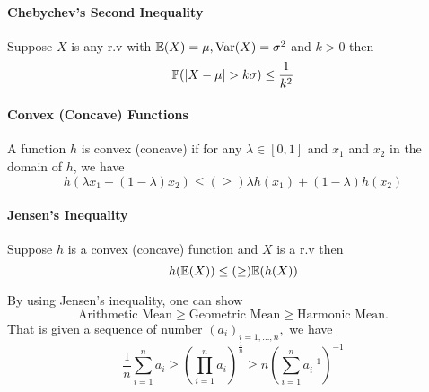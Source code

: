 \paragraph{Chebychev's Second Inequality}
Suppose \(X\) is any r.v with \(\mathbb{E}(X) = \mu, \operatorname{Var}(X) = \sigma^2\) and \(k > 0\) then
\[\mathbb{P}(|X - \mu| > k\sigma) \leq \frac{1}{k^2}\]

\paragraph{Convex (Concave) Functions}
A function \(h\) is convex (concave) if for any \(\lambda \in [0,1]\) and \(x_1\) and \(x_2\) in the domain of \(h\), we have
\[h(\lambda x_1 + (1 - \lambda)x_2) \leq (\geq) \lambda h(x_1) + (1 - \lambda)h(x_2)\]

\paragraph{Jensen's Inequality}
Suppose \(h\) is a convex (concave) function and \(X\) is a r.v then
\[h(\mathbb{E}(X)) \leq (\geq) \mathbb{E}(h(X))\]

By using Jensen's inequality, one can show
\[ \text{Arithmetic Mean} \geq \text{Geometric Mean} \geq \text{Harmonic Mean}. \]
That is given a sequence of number \((a_i)_{i=1,\dots,n},\) we have
\[\frac{1}{n} \sum_{i=1}^n a_i \geq \left(\prod_{i=1}^n a_i\right)^{\frac{1}{n}} \geq n \left(\sum_{i=1}^n a_i^{-1}\right)^{-1}\]